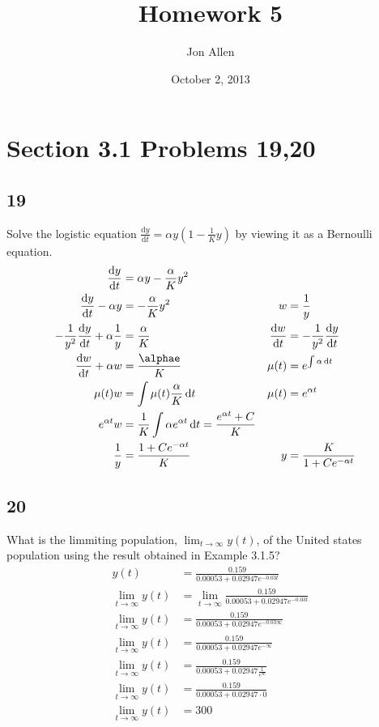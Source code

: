 \documentclass{article}
\begin{document}
\title{Homework 5}
\author{Jon Allen}
\date{October 2, 2013}
\maketitle
\section*{Section 3.1 Problems 19,20}
\subsection*{19}
Solve the logistic equation $\frac{\mathrm{d}y}{\mathrm{d}t}=\alpha y\left(1-\frac{1}{K}y\right)$ by viewing it as a Bernoulli equation.
\begin{align*}
\frac{\mathrm{d}y}{\mathrm{d}t}&=\alpha y-\frac{\alpha}{K}y^2\\
\frac{\mathrm{d}y}{\mathrm{d}t}-\alpha y&=-\frac{\alpha}{K}y^2 & w&=\frac{1}{y}\\
-\frac{1}{y^2}\frac{\mathrm{d}y}{\mathrm{d}t}+\alpha\frac{1}{y}&=\frac{\alpha}{K} & \frac{\mathrm{d}w}{\mathrm{d}t}&=-\frac{1}{y^2}\frac{\mathrm{d}y}{\mathrm{d}t}\\
\frac{\mathrm{d}w}{\mathrm{d}t}+\alpha w&=\frac{\alphae}{K} & \mu(t)&=e^{\int{\alpha\,\mathrm{d}t}}\\
\mu(t)w&=\int{\mu(t)\frac{\alpha}{K}\,\mathrm{d}t} & \mu(t)&=e^{\alpha t}\\
e^{\alpha t}w&=\frac{1}{K}\int{\alpha e^{\alpha t}\,\mathrm{d}t}=\frac{e^{\alpha t}+C}{K}\\
\frac{1}{y}&=\frac{1+Ce^{-\alpha t}}{K}&y&=\frac{K}{1+Ce^{-\alpha t}}
\end{align*}
\subsection*{20}
What is the limmiting population, $\displaystyle\lim_{t\to\infty}y(t)$, of the United states population using the result obtained in Example 3.1.5?
\begin{align*}
y(t)&=\frac{0.159}{0.00053+0.02947e^{-0.03t}}\\
\lim_{t\to\infty}y(t)&=\lim_{t\to\infty}\frac{0.159}{0.00053+0.02947e^{-0.03t}}\\
\lim_{t\to\infty}y(t)&=\frac{0.159}{0.00053+0.02947e^{-0.03\infty}}\\
\lim_{t\to\infty}y(t)&=\frac{0.159}{0.00053+0.02947e^{-\infty}}\\
\lim_{t\to\infty}y(t)&=\frac{0.159}{0.00053+0.02947\frac{1}{e^{\infty}}}\\
\lim_{t\to\infty}y(t)&=\frac{0.159}{0.00053+0.02947\cdot0}\\
\lim_{t\to\infty}y(t)&=300
\end{align*}
\end{document}
